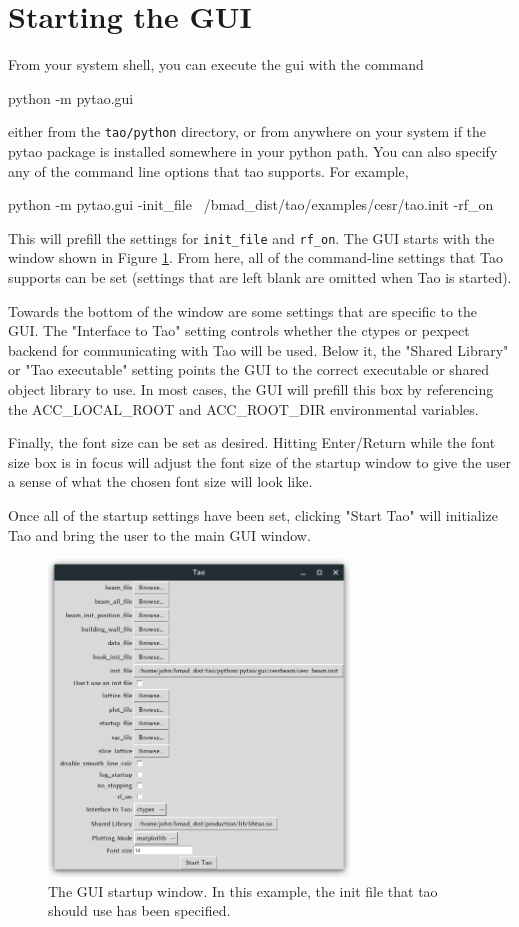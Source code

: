\section{Starting the GUI}
\label{s:gui.startup}
From your system shell, you can execute the gui with the command
\begin{example}
  python -m pytao.gui
\end{example}
either from the \texttt{tao/python} directory, or from anywhere on your system if the pytao package is installed somewhere in your python path.  You can also specify any of the command line options that tao supports.  For example,
\begin{example}
  python -m pytao.gui -init_file ~/bmad_dist/tao/examples/cesr/tao.init -rf_on
\end{example}
This will prefill the settings for \texttt{init_file} and \texttt{rf_on}.
The GUI starts with the window shown in Figure \ref{fig:startup}.
From here, all of the command-line settings that Tao supports can be set (settings that are left blank are omitted when Tao is started).

Towards the bottom of the window are some settings that are specific to the GUI.  The "Interface to Tao" setting controls whether the ctypes or pexpect backend for communicating with Tao will be used.
Below it, the "Shared Library" or "Tao executable" setting points the GUI to the correct executable or shared object library to use.
In most cases, the GUI will prefill this box by referencing the ACC_LOCAL_ROOT and ACC_ROOT_DIR environmental variables.

Finally, the font size can be set as desired.
Hitting Enter/Return while the font size box is in focus will adjust the font size of the startup window to give the user a sense of what the chosen font size will look like.

Once all of the startup settings have been set, clicking "Start Tao" will initialize Tao and bring the user to the main GUI window.
\begin{figure}
\includegraphics[width=8cm]{figures/startup.png}
\centering
\caption{The GUI startup window.  In this example, the init file that tao should use has been specified.}
\label{fig:startup}
\end{figure}

